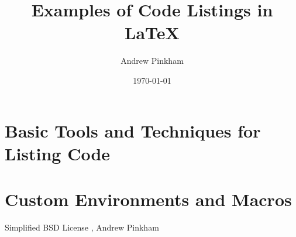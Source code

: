 


\title{Examples of Code Listings in \LaTeX{}}
\author{Andrew Pinkham} %
\date{\today}





\maketitle


\section[Basic Techniques]{Basic Tools and Techniques for Listing Code}



\section[Macros]{Custom Environments and Macros}


\begin{center}
Simplified BSD License , Andrew Pinkham
 \end{center}


